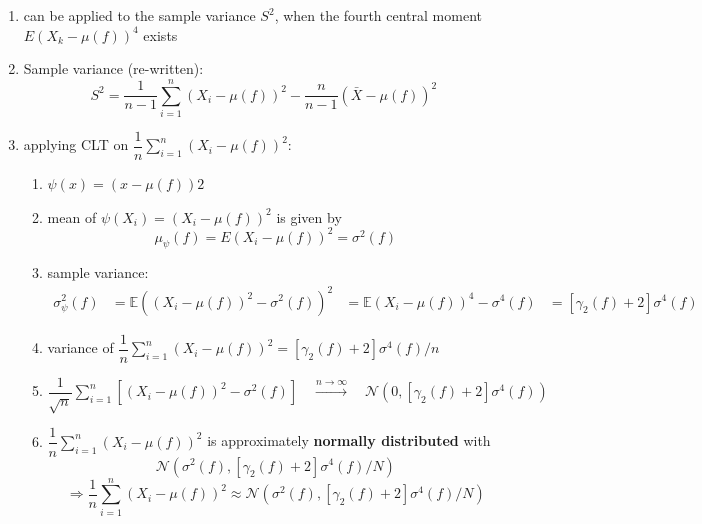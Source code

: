 \begin{enumerate}
    \item can be applied to the sample variance $S^2$, when the fourth central moment $E(X_k - \mu(f))^4$ exists

    \item Sample variance (re-written):
    \[
        S^2=
        \dfrac{1}{n-1}
        \displaystyle\sum_{i=1}^{n} (X_i-\mu(f))^2 -
        \dfrac{n}{n-1} (\bar{X} - \mu(f))^2
    \]

    \item applying CLT on $\dfrac{1}{n}
        \displaystyle\sum_{i=1}^{n} (X_i-\mu(f))^2$:
    \begin{enumerate}
        \item $\psi (x) = (x - \mu (f))2$
    
        \item mean of $\psi (X_i) = (X_i - \mu (f))^2$ is given by 
        \[
            \mu _\psi (f) = E(X_i -\mu (f))^2 = \sigma^2(f)
        \]
        
        \item sample variance:
        \begin{align*}
            \sigma ^2_\psi ( f ) 
            &= \mathbb{E}((X_i - \mu( f ))^2 - \sigma ^2( f ))^2
            &= \mathbb{E}(X_i - \mu( f ))^4 - \sigma ^4( f ) 
            &= [\gamma_2( f ) + 2]\sigma ^4( f )
        \end{align*}
    
        \item variance of $
            \dfrac{1}{n}
            \displaystyle\sum_{i=1}^{n} (X_i -\mu( f ))^2
            =
            [\gamma_2( f ) + 2]\sigma^4( f )/n
        $

        \item $
            \dfrac{1}{\sqrt{n}}
            \displaystyle\sum_{i=1}^{n}
            [(X_i - \mu( f )) ^2 - \sigma^2 ( f )]
            \quad
            \overset{n\to \infty}{\longrightarrow}
            \quad
            \mathcal{N}(0,[\gamma_2( f ) + 2]\sigma^4( f ))
        $

        \item $
            \dfrac{1}{n}
            \displaystyle\sum_{i=1}^{n} (X_i - \mu(f))^2
        $ 
        is approximately \textbf{normally distributed} with
        \[
            \mathcal{N}(\sigma^2( f ),[\gamma_2( f ) + 2]\sigma^4( f )/N )
        \]
        \[
            \Rightarrow
            \dfrac{1}{n}
            \displaystyle\sum_{i=1}^{n} (X_i - \mu(f))^2
            \approx
            \mathcal{N}(\sigma^2( f ),[\gamma_2( f ) + 2]\sigma^4( f )/N )
        \]


\end{enumerate}
\end{enumerate}
